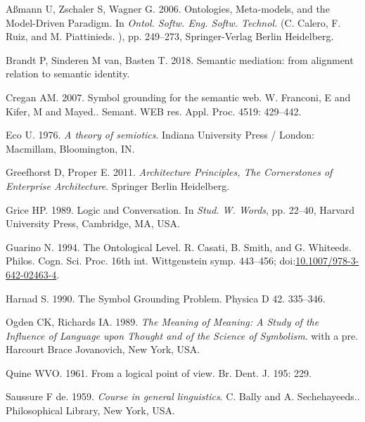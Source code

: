 \documentclass[a4paper,11pt,oneside,oldfontcommands]{memoir}
\theoremstyle{definition}
\theoremstyle{break}		%
\numberwithin{equation}{chapter}
\numberwithin{figure}{chapter}
\begin{document}
\setlength{\leftskip}{0.2in}

\setlength{\parskip}{8pt}

\hypertarget{refs}{}
\leavevmode\hypertarget{ref-Auxdfmann2006}{}%
Aßmann U, Zschaler S, Wagner G. 2006. Ontologies, Meta-models, and the
Model-Driven Paradigm. In \emph{Ontol. Softw. Eng. Softw. Technol.} (C.
Calero, F. Ruiz, and M. Piattinieds. ), pp. 249--273, Springer-Verlag
Berlin Heidelberg.

\leavevmode\hypertarget{ref-Brandt2018}{}%
Brandt P, Sinderen M van, Basten T. 2018. Semantic mediation: from
alignment relation to semantic identity.

\leavevmode\hypertarget{ref-Cregan2007}{}%
Cregan AM. 2007. Symbol grounding for the semantic web. W. Franconi, E
and Kifer, M and Mayed.. Semant. WEB res. Appl. Proc. 4519: 429--442.

\leavevmode\hypertarget{ref-Eco1976}{}%
Eco U. 1976. \emph{A theory of semiotics}. Indiana University Press /
London: Macmillam, Bloomington, IN.

\leavevmode\hypertarget{ref-Greefhorst2011}{}%
Greefhorst D, Proper E. 2011. \emph{Architecture Principles, The
Cornerstones of Enterprise Architecture}. Springer Berlin Heidelberg.

\leavevmode\hypertarget{ref-Grice:1991BT}{}%
Grice HP. 1989. Logic and Conversation. In \emph{Stud. W. Words}, pp.
22--40, Harvard University Press, Cambridge, MA, USA.

\leavevmode\hypertarget{ref-Guarino1994b}{}%
Guarino N. 1994. The Ontological Level. R. Casati, B. Smith, and G.
Whiteeds. Philos. Cogn. Sci. Proc. 16th int. Wittgenstein symp.
443--456;
doi:\href{https://doi.org/10.1007/978-3-642-02463-4}{10.1007/978-3-642-02463-4}.

\leavevmode\hypertarget{ref-Harnad1990}{}%
Harnad S. 1990. The Symbol Grounding Problem. Physica D 42. 335--346.

\leavevmode\hypertarget{ref-Ogden1989}{}%
Ogden CK, Richards IA. 1989. \emph{The Meaning of Meaning: A Study of
the Influence of Language upon Thought and of the Science of Symbolism}.
with a pre. Harcourt Brace Jovanovich, New York, USA.

\leavevmode\hypertarget{ref-Quine:1953er}{}%
Quine WVO. 1961. From a logical point of view. Br. Dent. J. 195: 229.

\leavevmode\hypertarget{ref-Saussure:1983ka}{}%
Saussure F de. 1959. \emph{Course in general linguistics}. C. Bally and
A. Sechehayeeds.. Philosophical Library, New York, USA.
\end{document}
